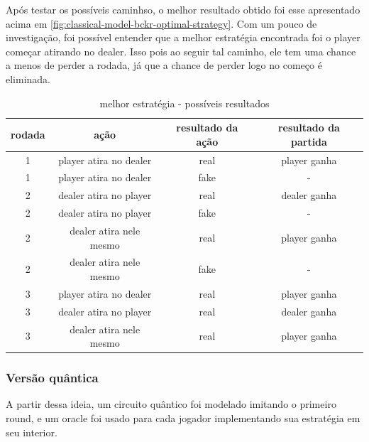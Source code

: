 \documentclass{article}
\begin{document}
Após testar os possíveis caminhso, o melhor resultado obtido foi esse apresentado acima em \ref{fig:classical-model-bckr-optimal-strategy}. Com um pouco de investigação, foi possível entender que a melhor estratégia encontrada foi o player começar atirando no dealer. Isso pois ao seguir tal caminho, ele tem uma chance a menos de perder a rodada, já que a chance de perder logo no começo é eliminada.




\begin{table}[!h]
	\begin{center}
		\begin{tabular}{ |c|c|c|c| } 
			\hline
			rodada & ação & resultado da ação & resultado da partida \\
			\hline
			1 & player atira no dealer  & real & player ganha\\
			\hline
			1 & player atira no dealer  & fake & -\\
			\hline
			2 & dealer atira no player  & real & dealer ganha\\
			\hline
			2 & dealer atira no player  & fake & -\\
			\hline
			2 & dealer atira nele mesmo  & real & player ganha\\
			\hline
			2 & dealer atira nele mesmo  & fake & -\\
			\hline
			3 & player atira no dealer  & real & player ganha\\
			\hline
			3 & dealer atira no player & real & dealer ganha\\
			\hline
			3 & dealer atira nele mesmo  & real & player ganha\\
			\hline
		\end{tabular}
		\caption{melhor estratégia - possíveis resultados}
	\end{center}
\end{table}

\subsubsection{Versão quântica}

A partir dessa ideia, um circuito quântico foi modelado imitando o primeiro round, e um oracle foi usado para cada jogador implementando sua estratégia em seu interior.
\end{document}
